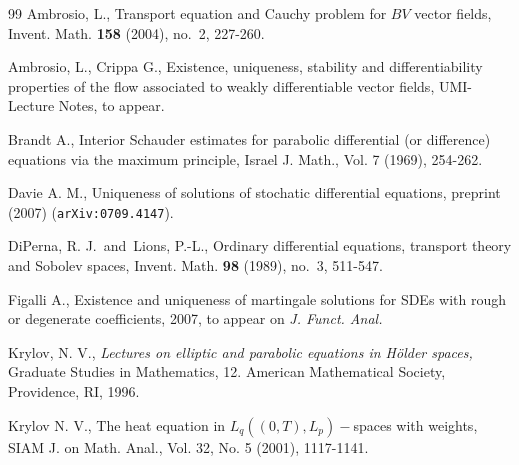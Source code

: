 \documentclass[a4paper,10pt]{article}
\begin{document}
\begin{thebibliography}{99}
Ambrosio, L., Transport equation and Cauchy problem for
$BV$ vector fields, Invent. Math. \textbf{158} (2004), no.~2, 227-260.

Ambrosio, L., Crippa G., Existence, uniqueness,
stability and differentiability properties of the flow associated to weakly
differentiable vector fields, UMI-Lecture Notes, to appear.


Brandt A., Interior Schauder estimates for parabolic differential
(or difference) equations via the maximum principle, Israel J. Math., Vol. 7
(1969), 254-262.


Davie A. M., Uniqueness of solutions of stochatic differential
equations, preprint (2007) (\texttt{arXiv:0709.4147}).

DiPerna, R. J.\ and\ Lions, P.-L., Ordinary
differential equations, transport theory and Sobolev spaces,
Invent. Math. \textbf{98} (1989), no.~3, 511-547.



 Figalli A., Existence and uniqueness of martingale solutions
for SDEs with rough or degenerate coefficients, 2007, to appear on \textit{J.
Funct. Anal.}


Krylov, N. V., {\it
 Lectures on elliptic and parabolic equations in
H\"{o}lder spaces,} Graduate Studies in Mathematics, 12. American
Mathematical Society, Providence, RI, 1996.

  Krylov N. V., The heat equation in $L_q((0, T),L_p)-$spaces with
weights, SIAM J. on Math. Anal., Vol. 32, No. 5 (2001), 1117-1141.






\end{thebibliography}
\end{document}
